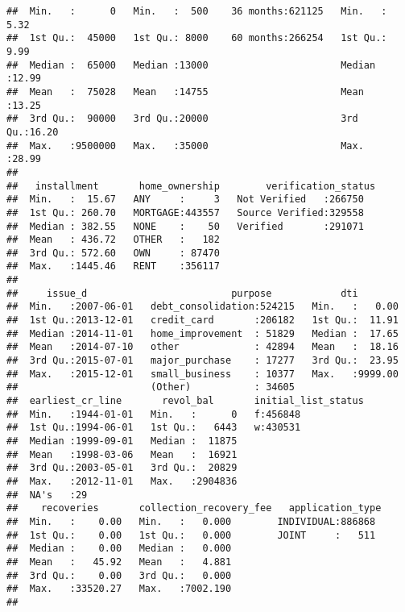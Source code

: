 \documentclass[]{article}
\begin{document}
\begin{verbatim}
##  Min.   :      0   Min.   :  500    36 months:621125   Min.   : 5.32  
##  1st Qu.:  45000   1st Qu.: 8000    60 months:266254   1st Qu.: 9.99  
##  Median :  65000   Median :13000                       Median :12.99  
##  Mean   :  75028   Mean   :14755                       Mean   :13.25  
##  3rd Qu.:  90000   3rd Qu.:20000                       3rd Qu.:16.20  
##  Max.   :9500000   Max.   :35000                       Max.   :28.99  
##                                                                       
##   installment       home_ownership        verification_status
##  Min.   :  15.67   ANY     :     3   Not Verified   :266750  
##  1st Qu.: 260.70   MORTGAGE:443557   Source Verified:329558  
##  Median : 382.55   NONE    :    50   Verified       :291071  
##  Mean   : 436.72   OTHER   :   182                           
##  3rd Qu.: 572.60   OWN     : 87470                           
##  Max.   :1445.46   RENT    :356117                           
##                                                              
##     issue_d                         purpose            dti         
##  Min.   :2007-06-01   debt_consolidation:524215   Min.   :   0.00  
##  1st Qu.:2013-12-01   credit_card       :206182   1st Qu.:  11.91  
##  Median :2014-11-01   home_improvement  : 51829   Median :  17.65  
##  Mean   :2014-07-10   other             : 42894   Mean   :  18.16  
##  3rd Qu.:2015-07-01   major_purchase    : 17277   3rd Qu.:  23.95  
##  Max.   :2015-12-01   small_business    : 10377   Max.   :9999.00  
##                       (Other)           : 34605                    
##  earliest_cr_line       revol_bal       initial_list_status
##  Min.   :1944-01-01   Min.   :      0   f:456848           
##  1st Qu.:1994-06-01   1st Qu.:   6443   w:430531           
##  Median :1999-09-01   Median :  11875                      
##  Mean   :1998-03-06   Mean   :  16921                      
##  3rd Qu.:2003-05-01   3rd Qu.:  20829                      
##  Max.   :2012-11-01   Max.   :2904836                      
##  NA's   :29                                                
##    recoveries       collection_recovery_fee   application_type 
##  Min.   :    0.00   Min.   :   0.000        INDIVIDUAL:886868  
##  1st Qu.:    0.00   1st Qu.:   0.000        JOINT     :   511  
##  Median :    0.00   Median :   0.000                           
##  Mean   :   45.92   Mean   :   4.881                           
##  3rd Qu.:    0.00   3rd Qu.:   0.000                           
##  Max.   :33520.27   Max.   :7002.190                           
##                                                                

\end{verbatim}
\end{document}
